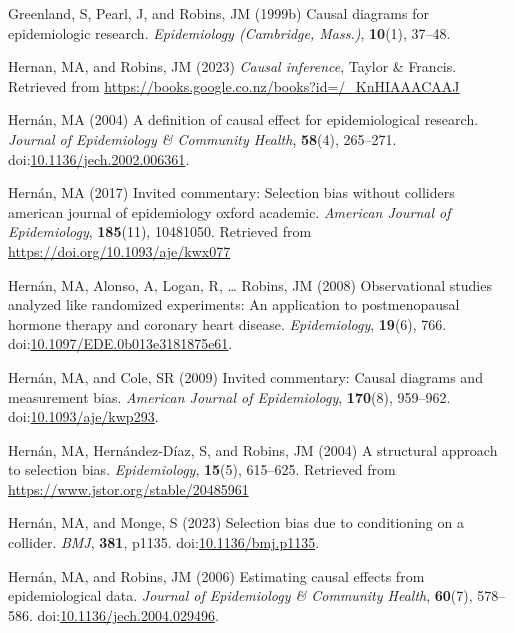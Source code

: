 \documentclass[
  singlecolumn,
  9pt]{article}
\begin{document}
\begin{CSLReferences}
Greenland, S, Pearl, J, and Robins, JM (1999b) Causal diagrams for
epidemiologic research. \emph{Epidemiology (Cambridge, Mass.)},
\textbf{10}(1), 37--48.

Hernan, MA, and Robins, JM (2023) \emph{Causal inference}, Taylor \&
Francis. Retrieved from
\url{https://books.google.co.nz/books?id=/_KnHIAAACAAJ}

Hernán, MA (2004) A definition of causal effect for epidemiological
research. \emph{Journal of Epidemiology \& Community Health},
\textbf{58}(4), 265--271.
doi:\href{https://doi.org/10.1136/jech.2002.006361}{10.1136/jech.2002.006361}.

Hernán, MA (2017) Invited commentary: Selection bias without colliders
\textbar{} american journal of epidemiology \textbar{} oxford academic.
\emph{American Journal of Epidemiology}, \textbf{185}(11), 10481050.
Retrieved from \url{https://doi.org/10.1093/aje/kwx077}

Hernán, MA, Alonso, A, Logan, R, \ldots{} Robins, JM (2008)
Observational studies analyzed like randomized experiments: An
application to postmenopausal hormone therapy and coronary heart
disease. \emph{Epidemiology}, \textbf{19}(6), 766.
doi:\href{https://doi.org/10.1097/EDE.0b013e3181875e61}{10.1097/EDE.0b013e3181875e61}.

Hernán, MA, and Cole, SR (2009) Invited commentary: Causal diagrams and
measurement bias. \emph{American Journal of Epidemiology},
\textbf{170}(8), 959--962.
doi:\href{https://doi.org/10.1093/aje/kwp293}{10.1093/aje/kwp293}.

Hernán, MA, Hernández-Díaz, S, and Robins, JM (2004) A structural
approach to selection bias. \emph{Epidemiology}, \textbf{15}(5),
615--625. Retrieved from \url{https://www.jstor.org/stable/20485961}

Hernán, MA, and Monge, S (2023) Selection bias due to conditioning on a
collider. \emph{BMJ}, \textbf{381}, p1135.
doi:\href{https://doi.org/10.1136/bmj.p1135}{10.1136/bmj.p1135}.

Hernán, MA, and Robins, JM (2006) Estimating causal effects from
epidemiological data. \emph{Journal of Epidemiology \& Community
Health}, \textbf{60}(7), 578--586.
doi:\href{https://doi.org/10.1136/jech.2004.029496}{10.1136/jech.2004.029496}.


\end{CSLReferences}
\end{document}
